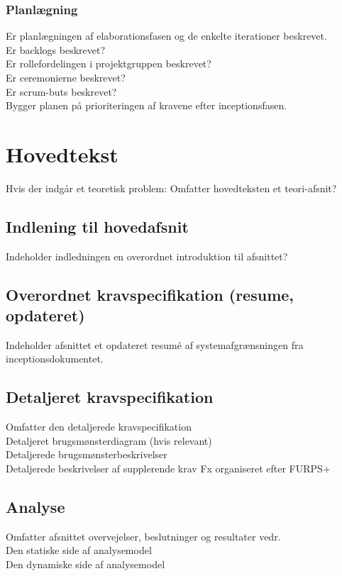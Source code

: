 \documentclass[12pt]{article}
\begin{document}
\subsubsection{Planlægning}
Er planlægningen af elaborationsfasen og de enkelte iterationer beskrevet.\\
Er backlogs beskrevet?\\
Er rollefordelingen i projektgruppen beskrevet?\\
Er ceremonierne beskrevet?\\
Er scrum-buts beskrevet?\\
Bygger planen på prioriteringen af kravene efter inceptionsfasen.\\

\section{Hovedtekst}
Hvis der indgår et teoretisk problem: Omfatter hovedteksten et teori-afsnit?\\
\subsection{Indlening til hovedafsnit}
Indeholder indledningen en overordnet introduktion til afsnittet?\\
\subsection{Overordnet kravspecifikation (resume, opdateret)}
Indeholder afsnittet et opdateret resumé  af systemafgrænsningen fra inceptionsdokumentet.
\subsection{Detaljeret kravspecifikation}
Omfatter den detaljerede kravspecifikation\\
Detaljeret brugsmønsterdiagram (hvis relevant)\\
Detaljerede brugsmønsterbeskrivelser\\
Detaljerede beskrivelser af supplerende krav Fx organiseret efter FURPS+\\
\subsection{Analyse}
Omfatter afsnittet overvejelser, beslutninger og resultater vedr.\\
Den statiske side af analysemodel\\
Den dynamiske side af analysemodel\\
\end{document}
